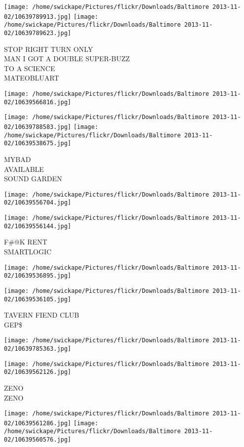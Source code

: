 \documentclass[10pt,letterpaper]{article}
\begin{document}
\texttt{[image: /home/swickape/Pictures/flickr/Downloads/Baltimore 2013-11-02/10639789913.jpg]}
\texttt{[image: /home/swickape/Pictures/flickr/Downloads/Baltimore 2013-11-02/10639789623.jpg]}

STOP RIGHT TURN ONLY\\
MAN I GOT A DOUBLE SUPER{-}BUZZ\\
TO A SCIENCE\\
MATEOBLUART
\pagebreak

\texttt{[image: /home/swickape/Pictures/flickr/Downloads/Baltimore 2013-11-02/10639566816.jpg]}

\vspace{0.25in}
\texttt{[image: /home/swickape/Pictures/flickr/Downloads/Baltimore 2013-11-02/10639788583.jpg]}
\texttt{[image: /home/swickape/Pictures/flickr/Downloads/Baltimore 2013-11-02/10639538675.jpg]}

MYBAD\\
AVAILABLE\\
SOUND GARDEN
\pagebreak

\texttt{[image: /home/swickape/Pictures/flickr/Downloads/Baltimore 2013-11-02/10639556704.jpg]}

\vspace{0.25in}
\texttt{[image: /home/swickape/Pictures/flickr/Downloads/Baltimore 2013-11-02/10639556144.jpg]}

F\#@K RENT\\
SMARTLOGIC
\pagebreak

\texttt{[image: /home/swickape/Pictures/flickr/Downloads/Baltimore 2013-11-02/10639536895.jpg]}

\vspace{0.25in}
\texttt{[image: /home/swickape/Pictures/flickr/Downloads/Baltimore 2013-11-02/10639536105.jpg]}

TAVERN FIEND CLUB\\
GEP\$
\pagebreak

\texttt{[image: /home/swickape/Pictures/flickr/Downloads/Baltimore 2013-11-02/10639785363.jpg]}

\vspace{0.25in}
\texttt{[image: /home/swickape/Pictures/flickr/Downloads/Baltimore 2013-11-02/10639562126.jpg]}

ZENO\\
ZENO
\pagebreak

\texttt{[image: /home/swickape/Pictures/flickr/Downloads/Baltimore 2013-11-02/10639561286.jpg]}
\texttt{[image: /home/swickape/Pictures/flickr/Downloads/Baltimore 2013-11-02/10639560576.jpg]}
\end{document}
